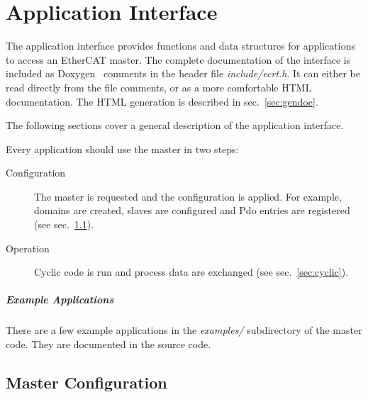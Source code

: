 \documentclass[a4paper,12pt,BCOR6mm,bibtotoc,idxtotoc]{scrbook}
\begin{document}

\chapter{Application Interface}
\label{chap:api}


The application interface provides functions and data structures for
applications to access an EtherCAT master. The complete documentation of the
interface is included as Doxygen~\cite{doxygen} comments in the header file
\textit{include/ecrt.h}. It can either be read directly from the file
comments, or as a more comfortable HTML documentation. The HTML generation is
described in sec.~\ref{sec:gendoc}.

The following sections cover a general description of the application
interface.

Every application should use the master in two steps:

\begin{description}

\item[Configuration] The master is requested and the configuration is applied.
For example, domains are created, slaves are configured and Pdo entries are
registered (see sec.~\ref{sec:masterconfig}).

\item[Operation] Cyclic code is run and process data are exchanged (see
sec.~\ref{sec:cyclic}).

\end{description}

\paragraph{Example Applications} There are a few
example applications in the \textit{examples/} subdirectory of the master
code. They are documented in the source code.


\section{Master Configuration}
\label{sec:masterconfig}
\end{document}
